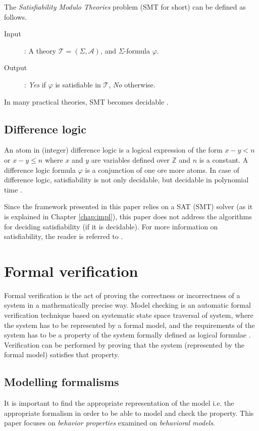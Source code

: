 The \emph{Satisfiability Modulo Theories} problem (SMT for short) can be defined as follows.
\begin{description}
	\item[Input]: A theory $\mathcal{T}=(\Sigma,\mathcal{A})$, and $\Sigma$-formula $\varphi$.
	\item[Output]: \emph{Yes} if $\varphi$ is satisfiable in $\mathcal{T}$, \emph{No} otherwise.
\end{description}

In many practical theories, SMT becomes decidable \cite{series/txtcs/KroeningS08}.

\subsection{Difference logic}

An atom in (integer) difference logic is a logical expression of the form $x-y<n$ or $x-y \leq n$ where $x$ and $y$ are variables defined over $\mathds{Z}$ and $n$ is a constant. A difference logic formula $\varphi$ is a conjunction of one ore more atoms. In case of difference logic, satisfiability is not only decidable, but decidable in polynomial time \cite{series/txtcs/KroeningS08}.

Since the framework presented in this paper relies on a SAT (SMT) solver (as it is explained in Chapter \ref{chap:impl}), this paper does not address the algorithms for deciding satisfiability (if it is decidable). For more information on satisfiability, the reader is referred to \cite{books/daglib/0019162}.


\section{Formal verification}

Formal verification is the act of proving the correctness or incorrectness of a system in a mathematically precise way. Model checking is an automatic formal verification technique based on systematic state space traversal of system, where the system has to be represented by a formal model, and the requirements of the system has to be a property of the system formally defined as logical formulae \cite{clarke_em-etal:1999a}. Verification can be performed by proving that the system (represented by the formal model) satisfies that property.

\subsection{Modelling formalisms}
It is important to find the appropriate representation of the model i.e. the appropriate formalism in order to be able to model and check the property. This paper focuses on \emph{behavior properties} examined on \emph{behavioral models}. 

